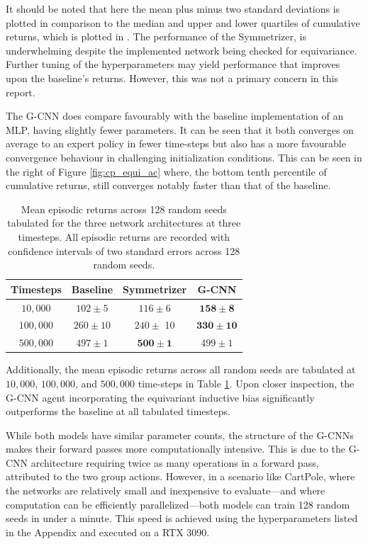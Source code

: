 It should be noted that here the mean plus minus two standard deviations is plotted in comparison to the median and upper and lower quartiles of cumulative returns, which is plotted in \cite{vanderpol2020mdp}. The performance of the Symmetrizer, is underwhelming despite the implemented network being checked for equivariance. Further tuning of the hyperparameters may yield performance that improves upon the baseline's returns. However, this was not a primary concern in this report.

The G-CNN does compare favourably with the baseline implementation of an MLP, having slightly fewer parameters. It can be seen that it both converges on average to an expert policy in fewer time-steps but also has a more favourable convergence behaviour in challenging initialization conditions. This can be seen in the right of Figure \ref{fig:cp_equi_ac} where, the bottom tenth percentile of cumulative returns, still converges notably faster than that of the baseline.

\begin{table}
	\centering
	\begin{tabular}{|c|c|c|c|}
		\hline
		Timesteps  & Baseline     & Symmetrizer          & G-CNN                 \\
		\hline
		$10, 000$  & $102 \pm 5$  & $116 \pm 6$          & $\mathbf{158 \pm 8}$  \\
		$100, 000$ & $260 \pm 10$ & $240 \pm$ 10         & $\mathbf{330 \pm 10}$ \\
		$500,000$  & $497 \pm 1$  & $\mathbf{500 \pm 1}$ & $499 \pm 1$           \\
		\hline
	\end{tabular}
	\caption{Mean episodic returns across 128 random seeds tabulated for the three network architectures at three timesteps. All episodic returns are recorded with confidence intervals of two standard errors across 128 random seeds.}
	\label{tab:actor-critic}
\end{table}
Additionally, the mean episodic returns across all random seeds are tabulated at $10,000$, $100,000$, and $500,000$ time-steps in Table \ref{tab:actor-critic}. Upon closer inspection, the G-CNN agent incorporating the equivariant inductive bias significantly outperforms the baseline at all tabulated timesteps.

While both models have similar parameter counts, the structure of the G-CNNs makes their forward passes more computationally intensive. This is due to the G-CNN architecture requiring twice as many operations in a forward pass, attributed to the two group actions. However, in a scenario like CartPole, where the networks are relatively small and inexpensive to evaluate—and where computation can be efficiently parallelized—both models can train 128 random seeds in under a minute. This speed is achieved using the hyperparameters listed in the Appendix and executed on a RTX 3090.

